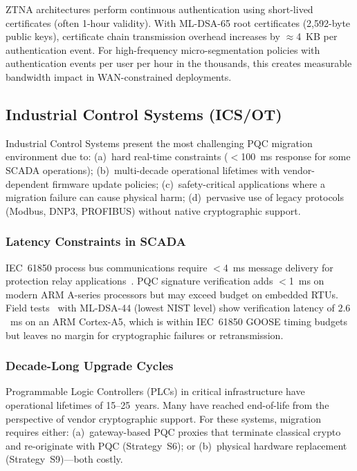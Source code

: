 \documentclass[journal]{IEEEtran}
\begin{document}
ZTNA architectures perform continuous authentication using short-lived
certificates (often 1-hour validity). With ML-DSA-65 root certificates
(2,592-byte public keys), certificate chain transmission overhead increases
by $\approx$4~KB per authentication event. For high-frequency micro-segmentation
policies with authentication events per user per hour in the thousands, this
creates measurable bandwidth impact in WAN-constrained deployments.

\subsection{Industrial Control Systems (ICS/OT)}
\label{sec:ics}

Industrial Control Systems present the most challenging PQC migration environment
due to: (a)~hard real-time constraints ($<$100~ms response for some SCADA
operations); (b)~multi-decade operational lifetimes with vendor-dependent
firmware update policies; (c)~safety-critical applications where a migration
failure can cause physical harm; (d)~pervasive use of legacy protocols
(Modbus, DNP3, PROFIBUS) without native cryptographic support.

\subsubsection{Latency Constraints in SCADA}

IEC~61850 process bus communications require $<$4~ms message delivery for
protection relay applications~\cite{iec61850}. PQC signature verification
adds $<$1~ms on modern ARM A-series processors but may exceed budget on
embedded RTUs. Field tests~\cite{tran2023pqc} with ML-DSA-44 (lowest NIST
level) show verification latency of $2.6$~ms on an ARM Cortex-A5, which
is within IEC~61850 GOOSE timing budgets but leaves no margin for cryptographic
failures or retransmission.

\subsubsection{Decade-Long Upgrade Cycles}

Programmable Logic Controllers (PLCs) in critical infrastructure have
operational lifetimes of 15--25~years. Many have reached end-of-life from
the perspective of vendor cryptographic support. For these systems,
migration requires either: (a)~gateway-based PQC proxies that terminate
classical crypto and re-originate with PQC (Strategy~S6); or (b)~physical
hardware replacement (Strategy~S9)---both costly.
\end{document}
